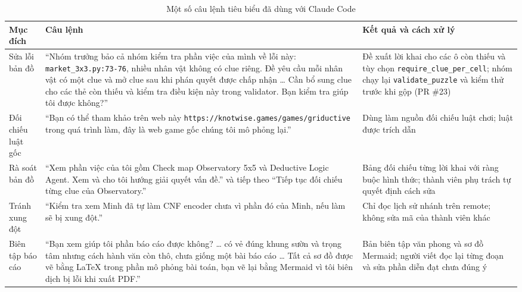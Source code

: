 \begin{table}[htbp]
  \centering\small
  \caption{Một số câu lệnh tiêu biểu đã dùng với Claude Code}
  \label{tab:ai_prompts}
  \begin{tabularx}{\textwidth}{>{\raggedright\arraybackslash}p{2.3cm}%
      >{\raggedright\arraybackslash}X>{\raggedright\arraybackslash}p{4cm}}
    \toprule
    \textbf{Mục đích} & \textbf{Câu lệnh} & \textbf{Kết quả và cách xử lý} \\
    \midrule
    Sửa lỗi bản đồ
      & ``Nhóm trưởng bảo cả nhóm kiểm tra phần việc của mình về lỗi này:
        \texttt{market\_3x3.py:73-76}, nhiều nhân vật không có clue riêng. Đề
        yêu cầu mỗi nhân vật có một clue và mở clue sau khi phán quyết được
        chấp nhận \ldots{} Cần bổ sung clue cho các thẻ còn thiếu và kiểm tra
        điều kiện này trong validator. Bạn kiểm tra giúp tôi được không?''
      & Đề xuất lời khai cho các ô còn thiếu và tùy chọn
        \texttt{require\_clue\_\allowbreak per\_cell}; nhóm chạy lại
        \texttt{validate\_puzzle} và kiểm thử trước khi gộp (PR \#23) \\
    \addlinespace
    Đối chiếu luật gốc
      & ``Bạn có thể tham khảo trên web này
        \nolinkurl{https://knotwise.games/games/griductive} trong quá trình làm,
        đây là web game gốc chúng tôi mô phỏng lại.''
      & Dùng làm nguồn đối chiếu luật chơi; luật được trích dẫn
        \cite{griductive_rules} \\
    \addlinespace
    Rà soát bản đồ
      & ``Xem phần việc của tôi gồm Check map Observatory 5x5 và Deductive
        Logic Agent. Xem và cho tôi hướng giải quyết vấn đề.'' và tiếp theo
        ``Tiếp tục đối chiếu từng clue của Observatory.''
      & Bảng đối chiếu từng lời khai với ràng buộc hình thức; thành viên phụ
        trách tự quyết định cách sửa \\
    \addlinespace
    Tránh xung đột
      & ``Kiểm tra xem Minh đã tự làm CNF encoder chưa vì phần đó của Minh,
        nếu làm sẽ bị xung đột.''
      & Chỉ đọc lịch sử nhánh trên remote; không sửa mã của thành viên khác \\
    \addlinespace
    Biên tập báo cáo
      & ``Bạn xem giúp tôi phần báo cáo được không? \ldots{} có vẻ đúng khung
        sườn và trọng tâm nhưng cách hành văn còn thô, chưa giống một bài báo
        cáo \ldots{} Tất cả sơ đồ được vẽ bằng LaTeX trong phần mô phỏng bài
        toán, bạn vẽ lại bằng Mermaid vì tôi biên dịch bị lỗi khi xuất PDF.''
      & Bản biên tập văn phong và sơ đồ Mermaid; người viết đọc lại từng đoạn
        và sửa phần diễn đạt chưa đúng ý \\

\end{tabularx}
\end{table}
